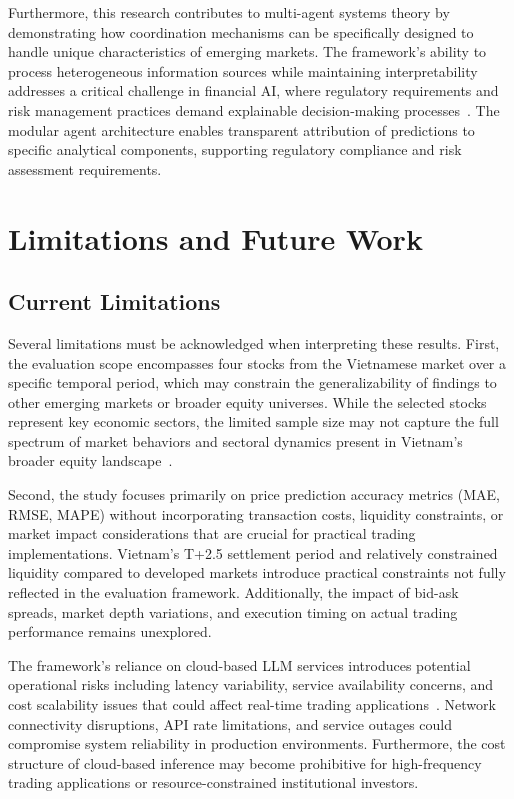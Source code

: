 \documentclass{ieeeaccess}
\begin{document}
Furthermore, this research contributes to multi-agent systems theory by demonstrating how coordination mechanisms can be specifically designed to handle unique characteristics of emerging markets. The framework's ability to process heterogeneous information sources while maintaining interpretability addresses a critical challenge in financial AI, where regulatory requirements and risk management practices demand explainable decision-making processes~\cite{arrieta2020explainable}. The modular agent architecture enables transparent attribution of predictions to specific analytical components, supporting regulatory compliance and risk assessment requirements.

\section{Limitations and Future Work}
\subsection{Current Limitations}
Several limitations must be acknowledged when interpreting these results. First, the evaluation scope encompasses four stocks from the Vietnamese market over a specific temporal period, which may constrain the generalizability of findings to other emerging markets or broader equity universes. While the selected stocks represent key economic sectors, the limited sample size may not capture the full spectrum of market behaviors and sectoral dynamics present in Vietnam's broader equity landscape~\cite{phan2015stock}.

Second, the study focuses primarily on price prediction accuracy metrics (MAE, RMSE, MAPE) without incorporating transaction costs, liquidity constraints, or market impact considerations that are crucial for practical trading implementations. Vietnam's T+2.5 settlement period and relatively constrained liquidity compared to developed markets introduce practical constraints not fully reflected in the evaluation framework. Additionally, the impact of bid-ask spreads, market depth variations, and execution timing on actual trading performance remains unexplored.

The framework's reliance on cloud-based LLM services introduces potential operational risks including latency variability, service availability concerns, and cost scalability issues that could affect real-time trading applications~\cite{qiu2020pre}. Network connectivity disruptions, API rate limitations, and service outages could compromise system reliability in production environments. Furthermore, the cost structure of cloud-based inference may become prohibitive for high-frequency trading applications or resource-constrained institutional investors.
\end{document}
